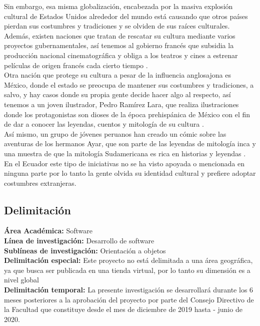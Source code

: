 \documentclass[a4paper, openright, 12pt]{report}
\begin{document}
Sin embargo, esa misma globalización, encabezada por la masiva explosión cultural de Estados Unidos alrededor del mundo está causando que otros países pierdan sus costumbres y tradiciones y se olviden de sus raíces culturales\cite{Boundless2019}. Además, existen naciones que tratan de rescatar su cultura mediante varios proyectos gubernamentales, así tenemos al gobierno francés que subsidia la producción nacional cinematográfica y obliga a los teatros y cines a estrenar películas de origen francés cada cierto tiempo \cite{VargasLlosa2000}.\\
Otra nación que protege su cultura a pesar de la influencia anglosajona es México, donde el estado se preocupa de mantener sus costumbres y tradiciones, a salvo, y hay casos donde su propia gente decide hacer algo al respecto, así tenemos a un joven ilustrador, Pedro Ramírez Lara, que realiza ilustraciones donde los protagonistas son dioses de la época prehispánica de México con el fin de dar a conocer las leyendas, cuentos y mitología de su cultura \cite{Mulato2016}.\\
Así mismo, un grupo de jóvenes peruanos han creado un cómic sobre las aventuras de los hermanos Ayar, que son parte de las leyendas de mitología inca y una muestra de que la mitología Sudamericana es rica en historias y leyendas \cite{Andina2019}. En el Ecuador este tipo de iniciativas no se ha visto apoyada o mencionada en ninguna parte por lo tanto la gente olvida su identidad cultural y prefiere adoptar costumbres extranjeras.

\subsection{Delimitación}
\begin{flushleft}
\textbf{Área Académica:} Software\\
\textbf{Línea de investigación:} Desarrollo de software\\
\textbf{Sublíneas de investigación:} Orientación a objetos\\
\textbf{Delimitación especial:} Este proyecto no está delimitada a una área geográfica, ya que busca ser publicada en una tienda virtual, por lo tanto su dimensión es a nivel global\\
\textbf{Delimitación temporal:} La presente investigación se desarrollará durante los
6 meses posteriores a la aprobación del proyecto por parte del Consejo Directivo
de la Facultad que constituye desde el mes de diciembre de 2019 hasta - junio de 2020.
\end{flushleft}
\end{document}
